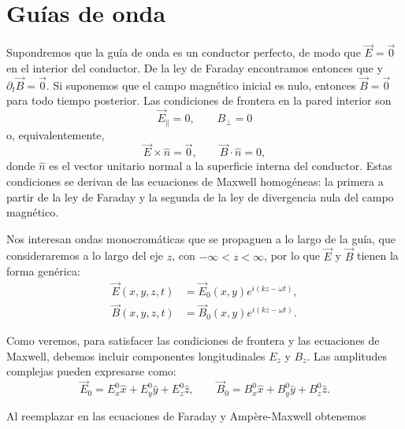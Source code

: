 \section{Guías de onda}
Supondremos que la guía de onda es un conductor perfecto, de modo que $\vec{E}=\vec{0}$ en el interior del conductor. De la ley de Faraday encontramos entonces que y $\partial_t\vec{B}=\vec{0}$. Si suponemos que el campo magnético inicial es nulo, entonces $\vec{B}=\vec{0}$ para todo tiempo posterior. Las condiciones de frontera en la pared interior son
\begin{equation}\label{CdBGO}
\vec{E}_\parallel=0, \qquad B_\perp=0
\end{equation}
o, equivalentemente, 
\begin{equation}
\vec{E}\times\hat{n}=\vec{0}, \qquad \vec{B}\cdot\hat{n}=0,
\end{equation}
donde $\hat{n}$ es el vector unitario normal a la superficie interna del conductor.
Estas condiciones se derivan de las ecuaciones de Maxwell homogéneas: la primera a partir de la ley de Faraday y la segunda de la ley de divergencia nula del campo magnético.

Nos interesan ondas monocromáticas que se propaguen a lo largo de la guía, que consideraremos a lo largo del eje $z$, con $-\infty<z<\infty$, por lo que $\vec{E}$ y $\vec{B}$ tienen la forma genérica:
\begin{equation}
\begin{aligned}
    \vec{E}(x, y, z, t) &= \vec{E}_0(x, y)e^{i(kz-\omega t)}, \\
    \vec{B}(x, y, z, t) &= \vec{B}_0(x, y)e^{i(kz-\omega t)}.
\end{aligned}
\label{eq:field_expressions}
\end{equation}

Como veremos, para satisfacer las condiciones de frontera y las ecuaciones de Maxwell, debemos incluir componentes longitudinales $E_z$ y $B_z$. 
Las amplitudes complejas pueden expresarse como:
\begin{equation}
\vec{E}_0 = E^0_x \hat{x} + E^0_y \hat{y} + E^0_z \hat{z},
\qquad
\vec{B}_0 = B^0_x \hat{x} + B^0_y \hat{y} + B^0_z \hat{z}.
\end{equation}

Al reemplazar en las ecuaciones de Faraday y Ampère-Maxwell obtenemos


